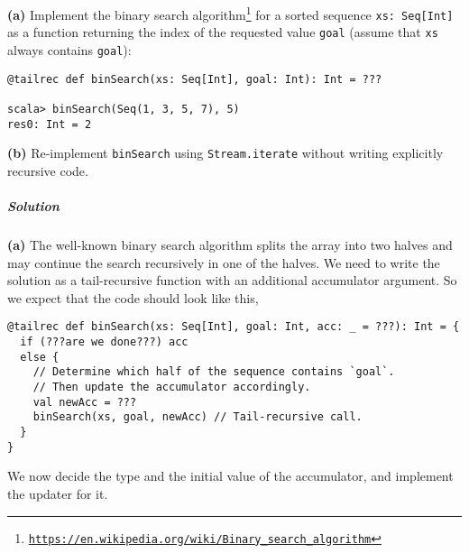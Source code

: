 \textbf{(a)} Implement the binary search algorithm\footnote{\texttt{\href{https://en.wikipedia.org/wiki/Binary_search_algorithm}{https://en.wikipedia.org/wiki/Binary\_search\_algorithm}}}
for a sorted sequence \lstinline!xs: Seq[Int]! as a function returning
the index of the requested value \lstinline!goal! (assume that \lstinline!xs!
always contains \lstinline!goal!):
\begin{lstlisting}
@tailrec def binSearch(xs: Seq[Int], goal: Int): Int = ???

scala> binSearch(Seq(1, 3, 5, 7), 5)
res0: Int = 2
\end{lstlisting}

\textbf{(b)} Re-implement \lstinline!binSearch! using \lstinline!Stream.iterate!
without writing explicitly recursive code.

\subparagraph{Solution}

\textbf{(a)} The well-known binary search algorithm splits the array
into two halves and may continue the search recursively in one of
the halves. We need to write the solution as a tail-recursive function
with an additional accumulator argument. So we expect that the code
should look like this,
\begin{lstlisting}
@tailrec def binSearch(xs: Seq[Int], goal: Int, acc: _ = ???): Int = {
  if (???are we done???) acc
  else {
    // Determine which half of the sequence contains `goal`.
    // Then update the accumulator accordingly.
    val newAcc = ???
    binSearch(xs, goal, newAcc) // Tail-recursive call.
  }
}
\end{lstlisting}
We now decide the type and the initial value of the accumulator, and
implement the updater for it.

